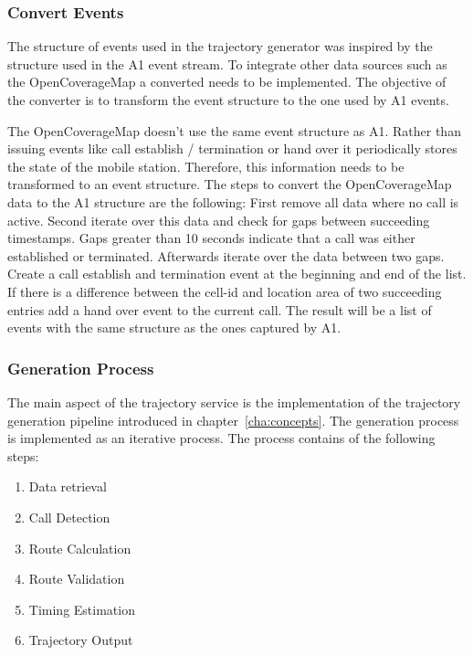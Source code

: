 \subsubsection{Convert Events}
The structure of events used in the trajectory generator was inspired by the structure used in the A1 event stream. To integrate other data sources such as the OpenCoverageMap a converted needs to be implemented. The objective of the converter is to transform the event structure to the one used by A1 events.

The OpenCoverageMap doesn't use the same event structure as A1. Rather than issuing events like call establish / termination or hand over it periodically stores the state of the mobile station. Therefore, this information needs to be transformed to an event structure. The steps to convert the OpenCoverageMap data to the A1 structure are the following: First remove all data where no call is active. Second iterate over this data and check for gaps between succeeding timestamps. Gaps greater than 10 seconds indicate that a call was either established or terminated. Afterwards iterate over the data between two gaps. Create a call establish and termination event at the beginning and end of the list. If there is a difference between the cell-id and location area of two succeeding entries add a hand over event to the current call. The result will be a  list of events with the same structure as the ones captured by A1.
\subsubsection{Generation Process}
The main aspect of the trajectory service is the implementation of the trajectory generation pipeline introduced in chapter~\ref{cha:concepts}. The generation process is implemented as an iterative process. The process contains of the following steps:
\begin{enumerate}
\item Data retrieval
\item Call Detection
\item Route Calculation
\item Route Validation
\item Timing Estimation
\item Trajectory Output
\end{enumerate}
